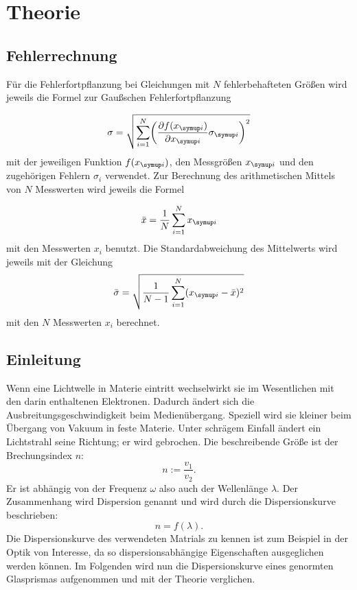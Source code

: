 \section{Theorie}
\label{sec:Theorie}

\subsection{Fehlerrechnung}

Für die Fehlerfortpflanzung bei Gleichungen mit $N$ fehlerbehafteten Größen
wird jeweils die Formel zur Gaußschen Fehlerfortpflanzung

\begin{equation*}
  \sigma = \sqrt{\sum_{i=1}^{N}\biggl(\frac{\partial f(x_{\g{i}})}{\partial x_{\g{i}}}
  \sigma_{\g{i}}\biggr)^2}
\end{equation*}
mit der jeweiligen Funktion $f(x_{\g{i}})$, den Messgrößen $x_{\g{i}}$ und den
zugehörigen Fehlern $\sigma_i$ verwendet.
Zur Berechnung des arithmetischen Mittels von $N$ Messwerten wird jeweils die
Formel

\begin{equation*}
  \bar{x} = \frac{1}{N}\sum_{i=1}^{N}x_{\g{i}}
\end{equation*}
mit den Messwerten $x_i$ benutzt.
Die Standardabweichung des Mittelwerts wird jeweils mit der Gleichung
\begin{equation*}
  \bar{\sigma} = \sqrt{\frac{1}{N-1}\sum_{i=1}^{N}(x_{\g{i}} - \bar{x})^2}
  \label{eqn:standard}
\end{equation*}
mit den $N$ Messwerten $x_i$ berechnet.

\subsection{Einleitung}

Wenn eine Lichtwelle in Materie eintritt wechselwirkt sie im Wesentlichen mit den
darin enthaltenen Elektronen. Dadurch ändert sich die Ausbreitungsgeschwindigkeit
beim Medienübergang. Speziell wird sie kleiner beim Übergang von Vakuum in feste Materie.
Unter schrägem Einfall ändert ein Lichtstrahl seine Richtung; er wird gebrochen.
Die beschreibende Größe ist der Brechungsindex $n$:
\begin{equation}
  n := \frac{v_1}{v_2}.
\end{equation}
Er ist abhängig von der Frequenz $\omega$ also auch der Wellenlänge $\lambda$.
Der Zusammenhang wird Dispersion genannt und wird durch die Dispersionskurve beschrieben:
\begin{equation}
  n = f(\lambda).
\end{equation}
Die Dispersionskurve des verwendeten Matrials zu kennen ist zum Beispiel in der Optik
von Interesse, da so dispersionsabhängige Eigenschaften ausgeglichen werden können.
Im Folgenden wird nun die Dispersionskurve eines genormten Glasprismas aufgenommen und
mit der Theorie verglichen.

